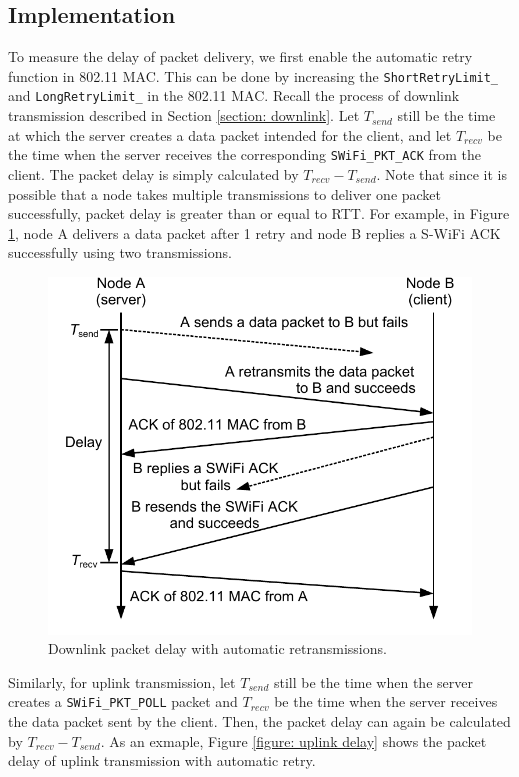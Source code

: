 \documentclass{article}
\begin{document}
\subsection{Implementation}
To measure the delay of packet delivery, we first enable the automatic retry function in 802.11 MAC. This can be done by increasing the \lstinline|ShortRetryLimit_| and \lstinline|LongRetryLimit_| in the 802.11 MAC. Recall the process of downlink transmission described in Section \ref{section: downlink}. Let $T_{send}$ still be the time at which the server creates a data packet intended for the client, and let $T_{recv}$ be the time when the server receives the corresponding \lstinline|SWiFi_PKT_ACK| from the client. The packet delay is simply calculated by $T_{recv}-T_{send}$. Note that since it is possible that a node takes multiple transmissions to deliver one packet successfully, packet delay is greater than or equal to RTT. For example, in Figure \ref{figure: downlink delay}, node A delivers a data packet after 1 retry and node B replies a S-WiFi ACK successfully using two transmissions.

\begin{figure}[htbp]
\centering
\includegraphics[scale = 0.7]{downlink_delay.pdf}
\caption{Downlink packet delay with automatic retransmissions.}
\label{figure: downlink delay}
\end{figure}

Similarly, for uplink transmission, let $T_{send}$ still be the time when the server creates a \lstinline|SWiFi_PKT_POLL| packet and $T_{recv}$ be the time when the server receives the data packet sent by the client. Then, the packet delay can again be calculated by $T_{recv}-T_{send}$. As an exmaple, Figure \ref{figure: uplink delay} shows the packet delay of uplink transmission with automatic retry.
\end{document}
